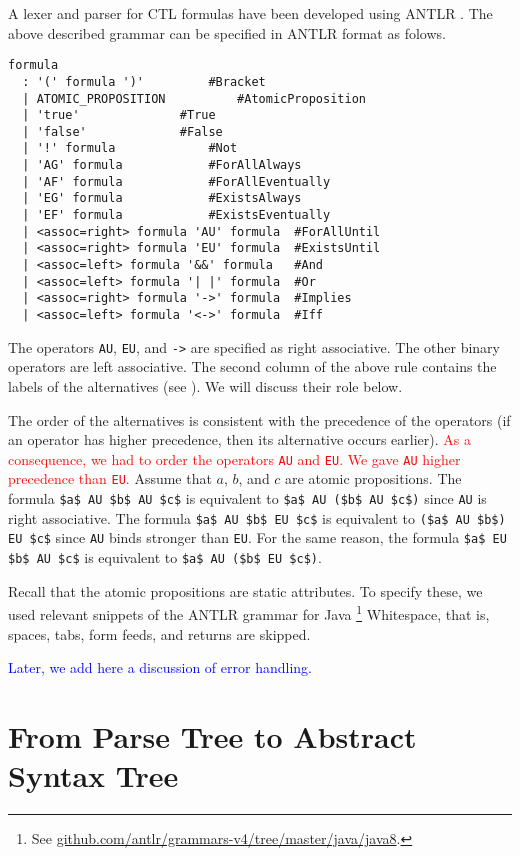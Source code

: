 \documentclass[12pt]{article}
\theoremstyle{definition}
\begin{document}
A lexer and parser for CTL formulas have been developed using ANTLR \cite{P13}.  The above described grammar can be specified in ANTLR format as folows.
\begin{lstlisting}
formula
  : '(' formula ')'			#Bracket
  | ATOMIC_PROPOSITION			#AtomicProposition
  | 'true'				#True
  | 'false'				#False
  | '!' formula				#Not
  | 'AG' formula			#ForAllAlways
  | 'AF' formula			#ForAllEventually
  | 'EG' formula			#ExistsAlways
  | 'EF' formula			#ExistsEventually
  | <assoc=right> formula 'AU' formula  #ForAllUntil
  | <assoc=right> formula 'EU' formula  #ExistsUntil
  | <assoc=left> formula '&&' formula	#And
  | <assoc=left> formula '| |' formula  #Or
  | <assoc=right> formula '->' formula  #Implies
  | <assoc=left> formula '<->' formula	#Iff
\end{lstlisting}
The operators \lstinline{AU}, \lstinline{EU}, and \lstinline{->} are specified as right associative.  The other binary operators are left associative.  The second column of the above rule contains the labels of the alternatives (see \cite[Section~8.2]{P13}).  We will discuss their role below.

The order of the alternatives is consistent with the precedence of the operators (if an operator has higher precedence, then its alternative occurs earlier).  \textcolor{red}{As a consequence, we had to order the operators \lstinline{AU} and \lstinline{EU}.  We gave \lstinline{AU} higher precedence than \lstinline{EU}.}
Assume that $a$, $b$, and $c$ are atomic propositions.  The formula \lstinline{$a$ AU $b$ AU $c$} is equivalent to \lstinline{$a$ AU ($b$ AU $c$)} since \lstinline{AU} is right associative.  The formula \lstinline{$a$ AU $b$ EU $c$} is equivalent to \lstinline{($a$ AU $b$) EU $c$} since \lstinline{AU} binds stronger than \lstinline{EU}.  For the same reason, the formula \lstinline{$a$ EU $b$ AU $c$} is equivalent to \lstinline{$a$ AU ($b$ EU $c$)}.

Recall that the atomic propositions are static attributes.  To specify these, we used relevant snippets of the ANTLR grammar for Java%
\footnote{See \href{https://github.com/antlr/grammars-v4/tree/master/java/java8}{github.com/antlr/grammars-v4/tree/master/java/java8}.}
Whitespace, that is, spaces, tabs, form feeds, and returns are skipped.

\textcolor{blue}{Later, we add here a discussion of error handling.}

\section{From Parse Tree to Abstract Syntax Tree}
\end{document}

